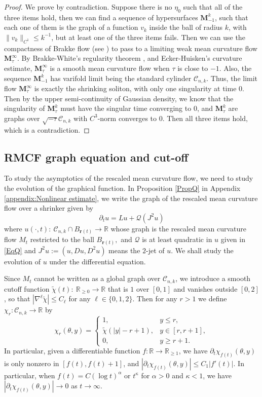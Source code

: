\documentclass[11pt]{amsart}
\numberwithin{equation}{section}
\numberwithin{equation}{section}
\newcommand{\bM}{\mathbf{M}}
\newcommand{\cC}{\mathcal{C}}
\newcommand{\cQ}{\mathcal{Q}}
\newcommand{\R}{\mathbb{R}}
\newcommand{\pr}{\partial}
\begin{document}
	\begin{proof}
		We prove by contradiction. Suppose there is no $\eta_0$ such that all of the three items hold, then we can find a sequence of hypersurfaces $\bM_{-1}^k$, such that each one of them is the graph of a function $v_k$ inside the ball of radius $k$, with $\|v_k\|_{C^1}\leq k^{-1}$, but at least one of the three items fails. Then we can use the compactness of Brakke flow (see \cite[Section 7]{I2}) to pass to a limiting weak mean curvature flow $\bM_\tau^{\infty}$. By Brakke-White's regularity theorem \cite{Wh4}, and Ecker-Huisken's curvature estimate, $\bM_\tau^{\infty}$ is a smooth mean curvature flow when $\tau$ is close to $-1$. Also, the sequence $\bM_{-1}^k$ has varifold limit being the standard cylinder $\cC_{n,k}$. Thus, the limit flow $\bM_\tau^{\infty}$ is exactly the shrinking soliton, with only one singularity at time $0$. Then by the upper semi-continuity of Gaussian density, we know that the singularity of $\bM_{\tau}^k$ must have the singular time converging to $0$, and $\bM_{\tau}^k$ are graphs over $\sqrt{-\tau}\cC_{n,k}$ with $C^3$-norm converges to $0$. Then all three items hold, which is a contradiction.
	\end{proof}
	
	
	
	
	\subsection{RMCF graph equation and cut-off}	\label{SSCone}
	To study the asymptotics of the rescaled mean curvature flow, we need to study the evolution of the graphical function. 
	In Proposition \ref{PropQ} in Appendix \ref{appendix:Nonlinear estimate}, we write the graph of the rescaled mean curvature flow over a shrinker given by
	\[
	\pr_t u=Lu+\cQ(J^2u)
	\]
	where $u(\cdot, t):\ \cC_{n,k}\cap B_{\mathbf r(t)}\to \R$ whose graph is the rescaled mean curvature flow $M_t$ restricted to the ball $B_{\mathbf r(t)},$ and $\cQ$ is at least quadratic in $u$ given in \eqref{EqQ} and $J^2u:=(u,Du,D^2u)$ means the $2$-jet of $u$. We shall study the evolution of $u$ under the differential equation. 
	
	Since $M_t$ cannot be written as a global graph over $\cC_{n,k}$, we introduce a smooth cutoff function $\tilde \chi(t):\ \R_{\geq 0}\to \R$ that is $1$ over $[0,1]$ and vanishes outside $[0,2]$, so that $|\nabla^\ell \tilde \chi|\leq C_{\ell}$ for any $\ell\in\{0,1,2\}$. Then for any $r>1$ we define $\chi_r:\cC_{n,k}\to\R$ by 
	\[
	\chi_r(\theta,y)=
	\begin{cases}
		1,& y\leq r,
		\\
		\tilde \chi(|y|-r+1), & y\in[r,r+1],
		\\
		0,& y\geq r+1.
	\end{cases}
	\]
	In particular, given a differentiable function $f:\R\to\R_{\geq 1}$, we have $\pr_t \chi_{f(t)}(\theta,y)$ is only nonzero in $[f(t),f(t)+1]$, and $|\pr_t \chi_{f(t)}(\theta,y)|\leq C_1|f'(t)|$. In particular, when $f(t)=C(\log t)^{\alpha}$ or $t^\kappa$ for $\alpha>0$ and $\kappa<1$, we have $|\pr_t \chi_{f(t)}(\theta,y)|\to 0$ as $t\to\infty$.
	
\end{document}
